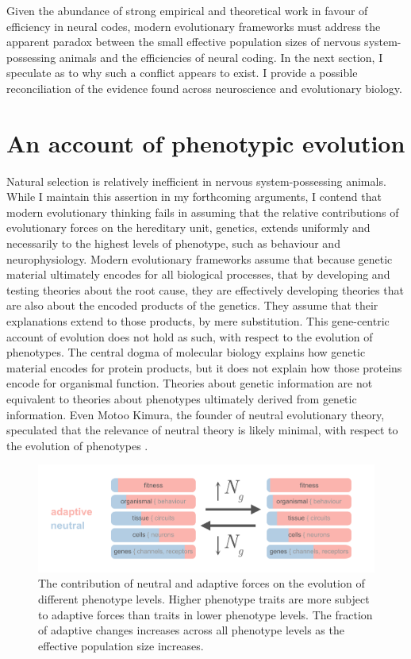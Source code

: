 \documentclass{article}
\begin{document}
Given the abundance of strong empirical and theoretical work in favour of efficiency in neural codes, modern evolutionary frameworks must address the apparent paradox between the small effective population sizes of nervous system-possessing animals and the efficiencies of neural coding. In the next section, I speculate as to why such a conflict appears to exist. I provide a possible reconciliation of the evidence found across neuroscience and evolutionary biology. 

\section{An account of phenotypic evolution}

Natural selection is relatively inefficient in nervous system-possessing animals. While I maintain this assertion in my forthcoming arguments, I contend that modern evolutionary thinking fails in assuming that the relative contributions of evolutionary forces on the hereditary unit, genetics, extends uniformly and necessarily to the highest levels of phenotype, such as behaviour and neurophysiology. Modern evolutionary frameworks assume that because genetic material ultimately encodes for all biological processes, that by developing and testing theories about the root cause, they are effectively developing theories that are also about the encoded products of the genetics. They assume that their explanations extend to those products, by mere substitution. This gene-centric account of evolution does not hold as such, with respect to the evolution of phenotypes. The central dogma of molecular biology \cite{crick_1970} explains how genetic material encodes for protein products, but it does not explain how those proteins encode for organismal function. Theories about genetic information are not equivalent to theories about phenotypes ultimately derived from genetic information. Even Motoo Kimura, the founder of neutral evolutionary theory, speculated that the relevance of neutral theory is likely minimal, with respect to the evolution of phenotypes \cite{kimura1983neutral, zhang_2018}. 

\begin{figure}[htp]
\centering
\includegraphics[width=17 cm]{fig_3.png}
\caption{The contribution of neutral and adaptive forces on the evolution of different phenotype levels. Higher phenotype traits are more subject to adaptive forces than traits in lower phenotype levels. The fraction of adaptive changes increases across all phenotype levels as the effective population size increases.}
\end{figure}
\end{document}
